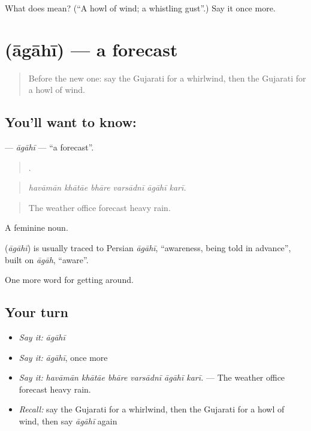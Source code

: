 \begin{tcolorbox}[breakable,colback=teal!4,colframe=teal!35!black,title={Before you move on}]
What does  mean? (\textquotedblleft{}A howl of wind; a whistling gust\textquotedblright{}.) Say it once more.
\end{tcolorbox}
\section[\texorpdfstring{\gu{આગાહી} (āgāhī)}{આગાહી (āgāhī)}]{ (āgāhī) — a forecast}

\label{lesson:GU-C435-agahi}



\begin{quote}
Before the new one: say the Gujarati for a whirlwind, then the Gujarati for a howl of wind.
\end{quote}

\subsection*{You'll want to know: }
\textbf{} — \emph{āgāhī} — \textquotedblleft{}a forecast\textquotedblright{}.

\begin{quote}
     .
\end{quote}

\begin{quote}
\emph{havāmān khātāe bhāre varsādnī āgāhī karī.}
\end{quote}

\begin{quote}
The weather office forecast heavy rain.
\end{quote}

A feminine noun.

\begin{cousinweb}
\textbf{} (\emph{āgāhī}) is usually traced to Persian \emph{āgāhī}, \textquotedblleft{}awareness, being told in advance\textquotedblright{}, built on \emph{āgāh}, \textquotedblleft{}aware\textquotedblright{}.
\end{cousinweb}

\begin{grammarlens}[title={What you've built}]
One more word for getting around.
\end{grammarlens}

\subsection*{Your turn}
\begin{itemize}
\raggedright
  \item \emph{Say it:} \emph{āgāhī}
  \item \emph{Say it:} \emph{āgāhī}, once more
  \item \emph{Say it:} \emph{havāmān khātāe bhāre varsādnī āgāhī karī.} — The weather office forecast heavy rain.
  \item \emph{Recall:} say the Gujarati for a whirlwind, then the Gujarati for a howl of wind, then say \emph{āgāhī} again
\end{itemize}

